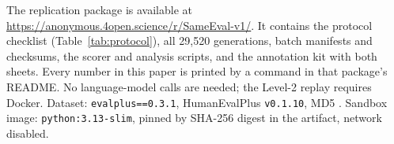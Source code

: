 \documentclass[acmsmall,screen,review,anonymous]{acmart}
\begin{document}
The replication package is available at
\url{https://anonymous.4open.science/r/SameEval-v1/}.
It contains the protocol checklist (Table~\ref{tab:protocol}), all 29{,}520
generations, batch manifests and checksums, the scorer and analysis scripts,
and the annotation kit with both sheets.
Every number in this paper is printed by a command in that package's README.
No language-model calls are needed; the Level-2 replay requires Docker.
Dataset: \texttt{evalplus==0.3.1}, HumanEvalPlus \texttt{v0.1.10}, MD5
.
Sandbox image: \texttt{python:3.13-slim}, pinned by SHA-256 digest in the
artifact, network disabled.



\end{document}

